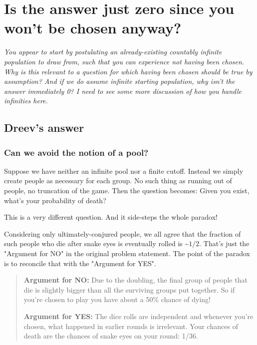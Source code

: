 \documentclass[article,twocolumn]{memoir}
\begin{document}
\chapter{Is the answer just zero since you won't be chosen anyway?}

\emph{You appear to start by postulating an already-existing countably infinite population to draw from, such that you can experience not having been chosen. 
Why is this relevant to a question for which having been chosen should be true by assumption? 
And if we do assume infinite starting population, why isn't the answer immediately 0? 
I need to see some more discussion of how you handle infinities here.}

\vspace{1em}

\section*{Dreev's answer}

\subsection{Can we avoid the notion of a pool?}

Suppose we have neither an infinite pool nor a finite cutoff.
Instead we simply create people as necessary for each group. 
No such thing as running out of people, no truncation of the game. 
Then the question becomes: 
Given you exist, what's your probability of death?

This is a very different question.
And it side-steps the whole paradox!

Considering only ultimately-conjured people, we all agree that the fraction of such people who die after snake eyes is eventually rolled is \~{}$1/2$.
That's just the "Argument for NO" in the original problem statement. 
The point of the paradox is to reconcile that with the "Argument for YES".

\begin{quote}
\textbf{Argument for NO:}
Due to the doubling, the final group of people that die is slightly bigger than all the surviving groups put together. 
So if you're chosen to play you have about a 50\% chance of dying!

\vspace{1em}

\textbf{Argument for YES:}
The dice rolls are independent and whenever you're chosen, what happened in earlier rounds is irrelevant.
Your chances of death are the chances of snake eyes on your round: 1/36.
\end{quote}
\end{document}
